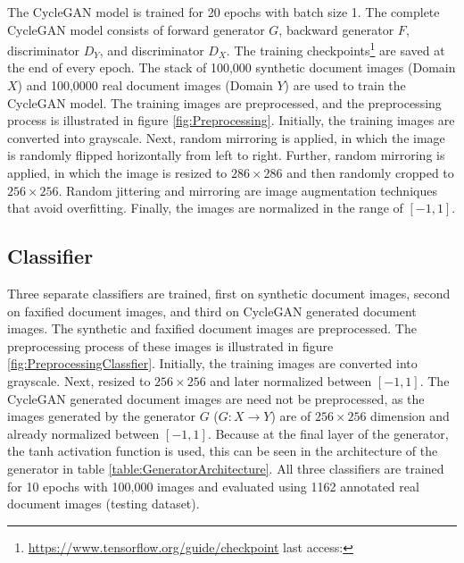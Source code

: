 The \ac{CycleGAN} model is trained for 20 epochs with batch size 1. The complete \ac{CycleGAN} model consists of forward generator $G$, backward generator $F$, discriminator $D_Y$, and discriminator $D_X$. The training checkpoints\footnote{\url{https://www.tensorflow.org/guide/checkpoint} last access: \dcdate} are saved at the end of every epoch. The stack of 100,000 synthetic document images (Domain $X$) and 100,0000 real document images (Domain $Y$) are used to train the \ac{CycleGAN} model. The training images are preprocessed, and the preprocessing process is illustrated in figure \ref{fig:Preprocessing}. Initially, the training images are converted into grayscale. Next, random mirroring is applied, in which the image is randomly flipped horizontally from left to right. Further, random mirroring is applied, in which the image is resized to $286 \times 286$ and then randomly cropped to $256 \times 256$. Random jittering and mirroring are image augmentation techniques that avoid overfitting\cite{zhu2020unpaired}. Finally, the images are normalized in the range of $[-1, 1]$.



\subsection{Classifier}

Three separate classifiers are trained, first on synthetic document images, second on faxified document images, and third on \ac{CycleGAN} generated document images. The synthetic and faxified document images are preprocessed. The preprocessing process of these images is illustrated in figure \ref{fig:PreprocessingClassfier}. Initially, the training images are converted into grayscale. Next, resized to $256 \times 256$ and later normalized between $[-1, 1]$. The \ac{CycleGAN} generated document images are need not be preprocessed, as the images generated by the generator $G$ ($G : X \rightarrow Y$) are of $256 \times 256$ dimension and already normalized between $[-1, 1]$. Because at the final layer of the generator, the tanh activation function is used, this can be seen in the architecture of the generator in table \ref{table:GeneratorArchitecture}. All three classifiers are trained for 10 epochs with 100,000 images and evaluated using 1162 annotated real document images (testing dataset).

